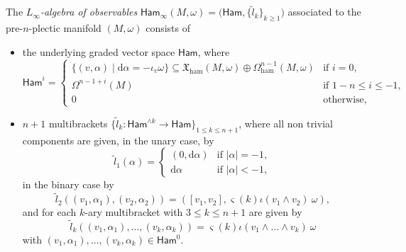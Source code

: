 \documentclass[10pt,a4paper]{amsart}
\numberwithin{equation}{section}
\newcommand{\Ham}{\mathsf{Ham}}
\newcommand{\ham}{\text{ham}}
\newcommand{\X}{\mathfrak{X}}
\renewcommand{\subset}{\subseteq}
\renewcommand{\d}{\mathrm{d}}
\begin{document}
\begin{Definition}\label{def:algebra_of_observables}
	The \emph{$L_{\infty}$-algebra of observables} $\Ham_\infty(M,\omega)=\bigl(\Ham,\bigl\{\tilde{l}_k\bigr\}_{k\geq 1}\bigr)$ associated to the pre-$n$-plectic manifold $(M,\omega)$ consists of
	\begin{itemize}\itemsep=0pt
		\item the underlying graded vector space $\Ham$, where
		\[
			\Ham^i=\begin{cases}
				\{(v,\alpha)\mid \d\alpha=-\iota_v\omega\}\subset \X_\ham(M,\omega)\oplus\Omega_{\ham}^{n-1}(M,\omega)
				&  \text{if } i=0,
				\\
				\Omega^{n-1+i}(M)
				&   \text{if } 1-n \leq i\leq -1,
				\\			
				0 & \text{otherwise,}
			\end{cases}
		\]

	\item $n+1$ multibrackets $\bigl\lbrace \tilde{l}_k\colon \Ham^{\wedge k} \to \Ham\bigr\rbrace_{1\leq k\leq n+1}$, where all non trivial components are given, in the unary case, by
		\[
			\tilde{l}_1(\alpha) =
			\begin{cases}
				(0,\d\alpha)	& \text{if~} |\alpha| = -1,	\\
				\d\alpha	& \text{if~} |\alpha| <-1,
			\end{cases}
		\]
		in the binary case by
		\[
			\tilde{l}_2 ((v_1,\alpha_1),(v_2,\alpha_2) ) =
				 ([v_1,v_2], \varsigma(k) \iota(v_1\wedge v_2)~\omega )
				,
		\]
		and for each $k$-ary multibracket with $3\leq k\leq n+1$ are given by
		\[
			\tilde{l}_k ((v_1,\alpha_1),\dots,(v_k,\alpha_k) ) =
				\varsigma(k) \iota(v_1\wedge\dots\wedge v_k)~\omega
		\]
		with  $(v_1,\alpha_1),\dots,(v_k,\alpha_k)\in\Ham^0$.%
	\end{itemize}
\end{Definition}
\end{document}
